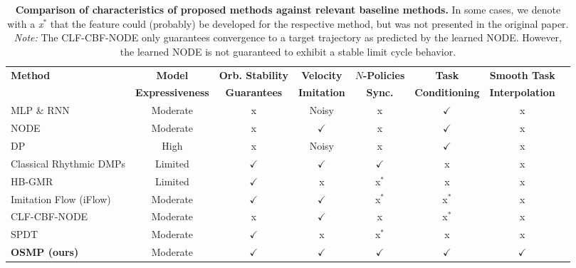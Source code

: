 \begin{table}
    \centering
    \caption{\textbf{Comparison of characteristics of proposed methods against relevant baseline methods.} 
    In some cases, we denote with a \emph{x$^*$} that the feature could (probably) be developed for the respective method, but was not presented in the original paper.
    \emph{Note:} The CLF-CBF-NODE only guarantees convergence to a target trajectory as predicted by the learned NODE. However, the learned NODE is not guaranteed to exhibit a stable limit cycle behavior.
    }
    \label{tab:osmp:osmp_characteristics_vs_baselines} %
    \begin{scriptsize}
    \setlength\tabcolsep{2.0pt}
    \begin{tabular}{l ccccccc}\\
        \toprule
        \textbf{Method} & \textbf{Model} & \textbf{Orb. Stability} & \textbf{Velocity} & \textbf{$N$-Policies} & \textbf{Task} & \textbf{Smooth Task}\\
        & \textbf{Expressiveness} & \textbf{Guarantees} & \textbf{Imitation} & \textbf{Sync.} & \textbf{Conditioning} & \textbf{Interpolation}\\
        \midrule
        \gls{MLP} \& \gls{RNN} & Moderate & x & Noisy & x & $\checkmark$ & x\\
        \gls{NODE} & Moderate & x & $\checkmark$ & x & $\checkmark$ & x\\
        \gls{DP}~\citep{chi2023diffusion} & High & x & Noisy & x & $\checkmark$ & x\\
        Classical Rhythmic \glspl{DMP}  & Limited & $\checkmark$ & $\checkmark$ & $\checkmark$ & x & x\\
        HB-GMR~\citep{khadivar2021learning} & Limited & $\checkmark$ & x & x$^*$ & x & x\\
        Imitation Flow (iFlow)~\citep{urain2020imitationflow} & Moderate & $\checkmark$ &  $\checkmark$ & x$^*$ & x$^*$ & x\\
        CLF-CBF-NODE~\citep{nawaz2024learning} & Moderate & x & $\checkmark$ & x & x$^*$ & x\\
        \gls{SPDT}~\citep{zhi2024teaching} & Moderate & $\checkmark$ & x & x$^*$ & x & x\\
        \textbf{\gls{OSMP} (ours)} & Moderate & $\checkmark$ & $\checkmark$ & $\checkmark$ & $\checkmark$ & $\checkmark$\\
        \bottomrule
    \end{tabular}
    \end{scriptsize}
\end{table}